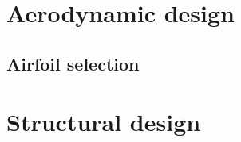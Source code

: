 \documentclass[11pt, a4paper, twoside]{book}
\begin{document}




\newpage


\tableofcontents
\listoffigures
\listoftables
\newpage




\chapter{Aerodynamic design}

\section{Airfoil selection} \label{RA_Aero_Design}
 


\chapter{Structural design}
\end{document}
